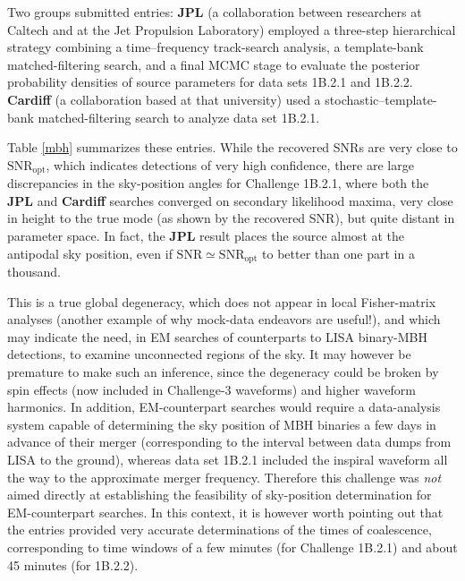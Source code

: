 \documentclass{iopart}
\begin{document}
Two groups submitted entries: \textbf{JPL} (a collaboration between researchers at Caltech and at the Jet Propulsion Laboratory) employed a three-step hierarchical strategy combining a time--frequency track-search analysis, a template-bank matched-filtering search, and a final MCMC stage to evaluate the posterior probability densities of source parameters for data sets 1B.2.1 and 1B.2.2. \textbf{Cardiff} (a collaboration based at that university) used a stochastic--template-bank matched-filtering search \cite{cardiffmbh} to analyze data set 1B.2.1.

Table \ref{mbh} summarizes these entries. While the recovered SNRs are very close to $\mathrm{SNR}_\mathrm{opt}$, which indicates detections of very high confidence, there are large discrepancies in the sky-position angles for Challenge 1B.2.1, where both the \textbf{JPL} and \textbf{Cardiff} searches converged on secondary likelihood maxima, very close in height to the true mode (as shown by the recovered SNR), but quite distant in parameter space.
In fact, the \textbf{JPL} result places the source almost at the antipodal sky position, even if $\mathrm{SNR} \simeq \mathrm{SNR}_\mathrm{opt}$ to better than one part in a thousand.

This is a true global degeneracy, which does not appear in local Fisher-matrix analyses (another example of why mock-data endeavors are useful!), and which may indicate the need, in EM searches of counterparts to LISA binary-MBH detections, to examine unconnected regions of the sky. It may however be premature to make such an inference, since the degeneracy could be broken by spin effects (now included in Challenge-3 waveforms) and higher waveform harmonics. In addition, EM-counterpart searches would require a data-analysis system capable of determining the sky position of MBH binaries a few days in advance of their merger (corresponding to the interval between data dumps from LISA to the ground), whereas data set 1B.2.1 included the inspiral waveform all the way to the approximate merger frequency. Therefore this challenge was \emph{not} aimed directly at establishing the feasibility of sky-position determination for EM-counterpart searches.
In this context, it is however worth pointing out that the entries provided very accurate determinations of the times of coalescence, corresponding to time windows of a few minutes (for Challenge 1B.2.1) and about 45 minutes (for 1B.2.2).
\end{document}
